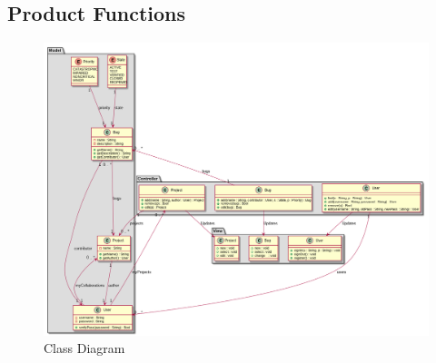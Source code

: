 \documentclass{article}
\newcommand{\comment}[1]{}
\begin{document}
\subsection{Product Functions}
\comment{
	Summarize the major functions to the product must perform or must let the user perform. Details will be provided in Section 3, so only a high level summary (such as a bullet list) is needed here. Organize the functions to make them understandable to any ready of the SRS. A picture of the major groups of related requirements and how they relate, such as a top level data flow diagram or object class diagram, is often effective.
	}
\begin{figure}[h]
\caption{Class Diagram}
\centering
\includegraphics[width=\textwidth]{class-diagram.png}
\end{figure}
\end{document}

